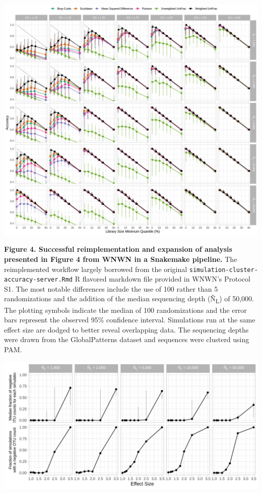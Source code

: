 \documentclass[
]{article}
\begin{document}
\newpage

\includegraphics{figure_04.png}

\textbf{Figure 4. Successful reimplementation and expansion of analysis
presented in Figure 4 from WNWN in a Snakemake pipeline.} The
reimplemented workflow largely borrowed from the original
\texttt{simulation-cluster-accuracy-server.Rmd} R flavored markdown file
provided in WNWN's Protocol S1. The most notable differences include the
use of 100 rather than 5 randomizations and the addition of the median
sequencing depth (Ñ\textsubscript{L}) of 50,000. The plotting symbols
indicate the median of 100 randomizations and the error bars represent
the observed 95\% confidence interval. Simulations run at the same
effect size are dodged to better reveal overlapping data. The sequencing
depths were drawn from the GlobalPatterns dataset and sequences were
clusterd using PAM.

\newpage

\includegraphics{figure_05.png}
\end{document}
